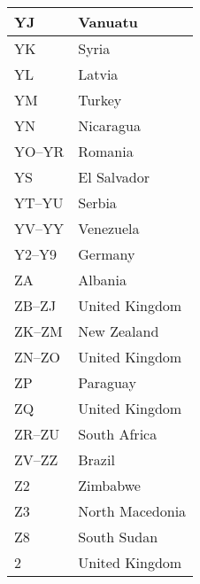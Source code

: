 \begin{longtable}{|l|l|}
  \hline
  YJ                  & Vanuatu                                   \\
  \hline
  YK                  & Syria                                     \\
  \hline
  YL                  & Latvia                                    \\
  \hline
  YM                  & Turkey                                    \\
  \hline
  YN                  & Nicaragua                                 \\
  \hline
  YO--YR              & Romania                                   \\
  \hline
  YS                  & El Salvador                               \\
  \hline
  YT--YU              & Serbia                                    \\
  \hline
  YV--YY              & Venezuela                                 \\
  \hline
  Y2--Y9              & Germany                                   \\
  \hline
  ZA                  & Albania                                   \\
  \hline
  ZB--ZJ              & United Kingdom                            \\
  \hline
  ZK--ZM              & New Zealand                               \\
  \hline
  ZN--ZO              & United Kingdom                            \\
  \hline
  ZP                  & Paraguay                                  \\
  \hline
  ZQ                  & United Kingdom                            \\
  \hline
  ZR--ZU              & South Africa                              \\
  \hline
  ZV--ZZ              & Brazil                                    \\
  \hline
  Z2                  & Zimbabwe                                  \\
  \hline
  Z3                  & North Macedonia                           \\
  \hline
  Z8                  & South Sudan                               \\
  \hline
  2                   & United Kingdom                            \\
  \hline

\end{longtable}
